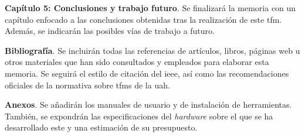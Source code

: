 \begin{description}
    \item\textbf{Capítulo 5: Conclusiones y trabajo futuro}. Se finalizará la memoria con un capítulo enfocado a las conclusiones obtenidas tras la realización de este \gls{tfm}. Además, se indicarán las posibles vías de trabajo a futuro.

    \item[]\textbf{Bibliografía}. Se incluirán todas las referencias de artículos, libros, páginas web u otros materiales que han sido consultados y empleados para elaborar esta memoria. Se seguirá el estilo de citación del \gls{ieee}, así como las recomendaciones oficiales de la normativa sobre \gls{tfm}s de la \gls{uah}. 

    \item[]\textbf{Anexos}. Se añadirán los manuales de usuario y de instalación de herramientas. También, se expondrán las especificaciones del \textit{hardware} sobre el que se ha desarrollado este  y una estimación de su presupuesto.
    
\end{description}

